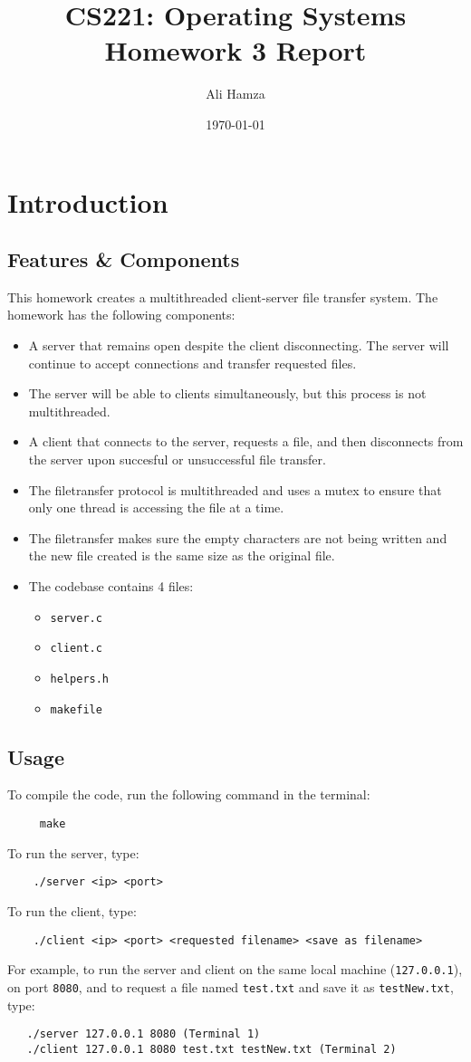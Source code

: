 \documentclass{article}
\title{CS221: Operating Systems\\ \Huge Homework 3 Report}
\author{Ali Hamza}
\date{\today}
\begin{document}
\maketitle    
\section{Introduction}
\subsection{Features \& Components}
This homework creates a multithreaded client-server file transfer system. The homework has the following components:
\begin{itemize}
    \item A server that remains open despite the client disconnecting. The server will continue to accept connections and transfer requested files.
    \item The server will be able to clients simultaneously, but this process is not multithreaded.
    \item A client that connects to the server, requests a file, and then disconnects from the server upon succesful or unsuccessful file transfer.
    \item The filetransfer protocol is multithreaded and uses a mutex to ensure that only one thread is accessing the file at a time.
    \item The filetransfer makes sure the empty characters are not being written and the new file created is the same size as the original file.
    \item The codebase contains 4 files:
        \begin{itemize}
            \item \texttt{server.c}
            \item \texttt{client.c}
            \item \texttt{helpers.h}
            \item \texttt{makefile}
            \end{itemize}
\end{itemize}
\subsection{Usage}
To compile the code, run the following command in the terminal:
\begin{verbatim}
     make
\end{verbatim}
To run the server, type:
\begin{verbatim}
    ./server <ip> <port>
\end{verbatim}
To run the client, type:
\begin{verbatim}
    ./client <ip> <port> <requested filename> <save as filename>
\end{verbatim}
For example, to run the server and client on the same local machine (\texttt{127.0.0.1}), on port \texttt{8080}, and to request a file named \texttt{test.txt} and save it as \texttt{testNew.txt}, type:
\begin{verbatim}
   ./server 127.0.0.1 8080 (Terminal 1)
   ./client 127.0.0.1 8080 test.txt testNew.txt (Terminal 2)
\end{verbatim}
\end{document}
